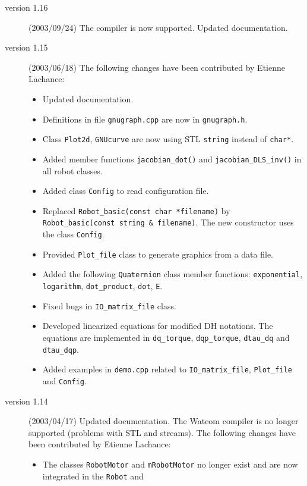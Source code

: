 \documentclass[dvips,11pt,fleqn]{report}
\begin{document}
\begin{description}
\item[version 1.16] (2003/09/24) The
   compiler is now supported.
  Updated documentation.
\item[version 1.15] (2003/06/18) 
  The following changes have been contributed by Etienne Lachance:
  \begin{itemize}
  \item Updated documentation.
  \item Definitions in file \texttt{gnugraph.cpp} are now in
    \texttt{gnugraph.h}.
  \item Class \texttt{Plot2d}, \texttt{GNUcurve} are now using
    \textsf{STL} \texttt{string} instead of \texttt{char*}.
  \item Added member functions \texttt{jacobian\_dot()} and
    \texttt{jacobian\_DLS\_inv()} in all robot classes.
  \item Added class \texttt{Config} to read configuration file.
  \item Replaced \texttt{Robot\_basic(const char *filename)} by
    \texttt{Robot\_basic(const string \& filename)}. The new
    constructor uses the class \texttt{Config}.
  \item Provided \texttt{Plot\_file} class to generate graphics from a
    data file.
  \item Added the following \texttt{Quaternion} class member
    functions: \texttt{exponential}, \texttt{logarithm},
    \texttt{dot\_product}, \texttt{dot}, \texttt{E}.
  \item Fixed bugs in \texttt{IO\_matrix\_file} class.
  \item Developed linearized equations for modified DH notations. The
    equations are implemented in \texttt{dq\_torque},
    \texttt{dqp\_torque}, \texttt{dtau\_dq} and \texttt{dtau\_dqp}.
  \item Added examples in \texttt{demo.cpp} related to
    \texttt{IO\_matrix\_file}, \texttt{Plot\_file} and
    \texttt{Config}.
  \end{itemize}
\item[version 1.14] (2003/04/17) Updated documentation. The
  \textsf{Watcom} compiler is no longer supported (problems with
  \textsf{STL} and streams). The following changes have been
  contributed by Etienne Lachance:
  \begin{itemize}
  \item The classes \texttt{RobotMotor} and \texttt{mRobotMotor} no
    longer exist and are now integrated in the \texttt{Robot} and

\end{itemize}
\end{description}
\end{document}
